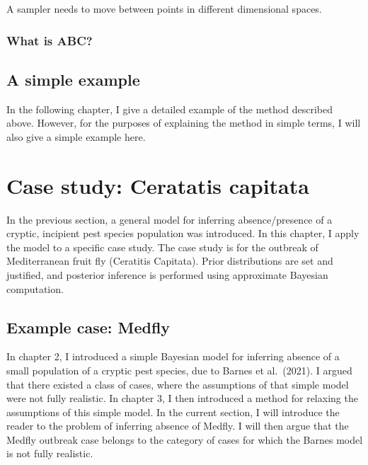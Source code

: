 \documentclass[
]{book}
\begin{document}
A sampler needs to move between points in different dimensional spaces.

\hypertarget{what-is-abc}{%
\subsection{What is ABC?}\label{what-is-abc}}

\hypertarget{a-simple-example}{%
\section{A simple example}\label{a-simple-example}}

In the following chapter, I give a detailed example of the method described above. However, for the purposes of explaining the method in simple terms, I will also give a simple example here.

\hypertarget{case-study-ceratatis-capitata}{%
\chapter{Case study: Ceratatis capitata}\label{case-study-ceratatis-capitata}}

In the previous section, a general model for inferring absence/presence of a cryptic, incipient pest species population was introduced. In this chapter, I apply the model to a specific case study. The case study is for the outbreak of Mediterranean fruit fly (Ceratitis Capitata). Prior distributions are set and justified, and posterior inference is performed using approximate Bayesian computation.

\hypertarget{example-case-medfly}{%
\section{Example case: Medfly}\label{example-case-medfly}}

In chapter 2, I introduced a simple Bayesian model for inferring absence of a small population of a cryptic pest species, due to Barnes et al.~(2021). I argued that there existed a class of cases, where the assumptions of that simple model were not fully realistic. In chapter 3, I then introduced a method for relaxing the assumptions of this simple model. In the current section, I will introduce the reader to the problem of inferring absence of Medfly. I will then argue that the Medfly outbreak case belongs to the category of cases for which the Barnes model is not fully realistic.
\end{document}
